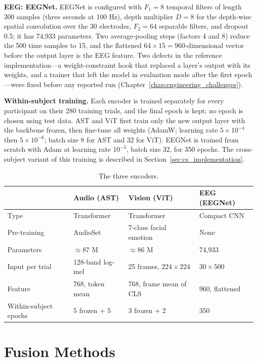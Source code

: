 \textbf{EEG: EEGNet.} EEGNet \cite{Lawhern2018EEGNet} is configured with $F_1 = 8$ temporal filters of length 300 samples (three seconds at 100 Hz), depth multiplier $D = 8$ for the depth-wise spatial convolution over the 30 electrodes, $F_2 = 64$ separable filters, and dropout 0.5; it has 74{,}933 parameters. Two average-pooling steps (factors 4 and 8) reduce the 500 time samples to 15, and the flattened $64 \times 15 = 960$-dimensional vector before the output layer is the EEG feature. Two defects in the reference implementation---a weight-constraint hook that replaced a layer's output with its weights, and a trainer that left the model in evaluation mode after the first epoch---were fixed before any reported run (Chapter~\ref{chap:engineering_challenges}).

\textbf{Within-subject training.} Each encoder is trained separately for every participant on their 280 training trials, and the final epoch is kept; no epoch is chosen using test data. AST and ViT first train only the new output layer with the backbone frozen, then fine-tune all weights (AdamW; learning rate $5\times10^{-4}$ then $5\times10^{-6}$; batch size 8 for AST and 32 for ViT). EEGNet is trained from scratch with Adam at learning rate $10^{-5}$, batch size 32, for 350 epochs. The cross-subject variant of this training is described in Section~\ref{sec:cs_implementation}.

\begin{table}[htbp]
\centering
\small
\caption{The three encoders.}
\label{tab:encoder_specs}
\begin{tabular}{p{2.8cm} p{3.4cm} p{3.4cm} p{3.4cm}}
\hline
& \textbf{Audio (AST)} & \textbf{Vision (ViT)} & \textbf{EEG (EEGNet)} \\
\hline
Type & Transformer & Transformer & Compact CNN \\
Pre-training & AudioSet & 7-class facial emotion & None \\
Parameters & $\approx$87 M & $\approx$86 M & 74{,}933 \\
Input per trial & 128-band log-mel & 25 frames, $224\times224$ & $30 \times 500$ \\
Feature & 768, token mean & 768, frame mean of CLS & 960, flattened \\
Within-subject epochs & 5 frozen + 5 & 3 frozen + 2 & 350 \\
\hline
\end{tabular}
\end{table}

\section{Fusion Methods}

